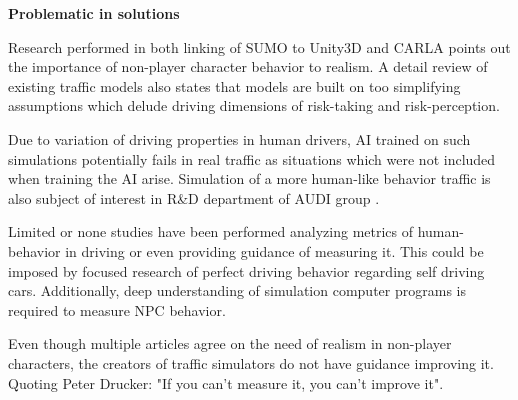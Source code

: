 \documentclass{VUMIFPS-master-intro}
\begin{document}
\textbf{Problematic in solutions}

Research performed in both linking of SUMO to Unity3D and CARLA points out the importance of non-player character behavior to realism. A detail review \cite{Eskandarian2017} of existing traffic models also states that models are built on too simplifying assumptions which delude driving dimensions of risk-taking and risk-perception.

Due to variation of driving properties in human drivers, AI trained on such simulations potentially fails in real traffic as situations which were not included when training the AI arise. Simulation of a more human-like behavior traffic is also subject of interest in R\&D department of AUDI group \cite{AUDI2018}.

Limited or none studies have been performed analyzing metrics of human-behavior in driving or even providing guidance of measuring it. This could be imposed by focused research of perfect driving behavior regarding self driving cars. Additionally, deep understanding of simulation computer programs is required to measure NPC behavior.

Even though multiple articles agree on the need of realism in non-player characters, the creators of traffic simulators do not have guidance improving it. Quoting Peter Drucker: "If you can't measure it, you can't improve it".



\end{document}
